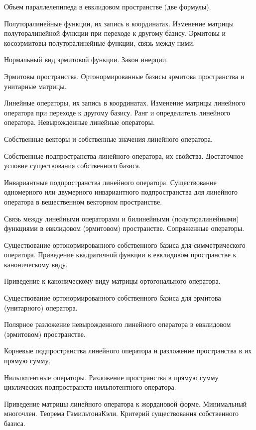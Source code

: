 \documentclass[a4paper]{article}
\begin{document}
\begin{nums}{-1}
\item Объем параллелепипеда в евклидовом пространстве (две формулы).
\item Полуторалинейные функции, их запись в координатах. Изменение матрицы полуторалинейной функции при переходе к другому базису.
Эрмитовы и косоэрмитовы полуторалинейные функции, связь между ними.
\item Нормальный вид эрмитовой функции. Закон инерции.
\item Эрмитовы пространства. Ортонормированные базисы эрмитова пространства и унитарные матрицы.
\item Линейные операторы, их запись в координатах. Изменение матрицы линейного оператора при переходе к другому базису. Ранг и
определитель линейного оператора. Невырожденные линейные операторы.
\item Собственные векторы и собственные значения линейного оператора.
\item Собственные подпространства линейного оператора, их свойства. Достаточное условие существования собственного базиса.
\item Инвариантные подпространства линейного оператора. Существование одномерного или двумерного инвариантного
подпространства для линейного оператора в вещественном векторном пространстве.
\item Связь между линейными операторами и билинейными (полуторалинейными) функциями в евклидовом (эрмитовом)
пространстве. Сопряженные операторы.
\item Существование ортонормированного собственного базиса для симметрического оператора. Приведение квадратичной функции в
евклидовом пространстве к каноническому виду.
\item Приведение к каноническому виду матрицы ортогонального оператора.
\item Существование ортонормированного собственного базиса для эрмитова (унитарного) оператора.
\item Полярное разложение невырожденного линейного оператора в евклидовом (эрмитовом) пространстве.
\item Корневые подпространства линейного оператора и разложение пространства в их прямую сумму.
\item Нильпотентные операторы. Разложение пространства в прямую сумму циклических подпространств нильпотентного оператора.
\item Приведение матрицы линейного оператора к жордановой форме. Минимальный многочлен. Теорема Гамильтона\ч Кэли.
Критерий существования собственного базиса.

\end{nums}
\end{document}
